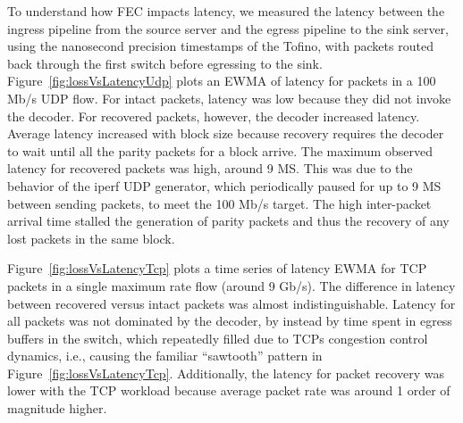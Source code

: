 To understand how FEC impacts latency, we measured the latency  between the
ingress pipeline from the source server and the egress pipeline  to the sink
server, using the nanosecond precision  timestamps of the Tofino, with packets
routed back through the first  switch before egressing to the sink.
Figure~\ref{fig:lossVsLatencyUdp}  plots an EWMA of latency for packets in a
100 Mb/s UDP flow. For  intact packets, latency was low because they did not
invoke  the decoder. For  recovered packets, however, the decoder increased
latency. Average  latency increased with block size because  recovery requires
the decoder to wait until all the parity packets  for a block arrive. The
maximum observed latency for recovered packets  was high, around 9 MS. This
was due to the behavior of the iperf  UDP generator, which periodically paused
for up to 9 MS between  sending packets, to meet the 100 Mb/s target. The high
inter-packet  arrival time stalled the generation of parity packets and thus
the  recovery of any lost packets in the same block.

Figure~\ref{fig:lossVsLatencyTcp} plots a time series of latency EWMA  for TCP
packets in a single maximum rate flow (around 9 Gb/s). The difference in
latency between recovered versus intact packets was almost indistinguishable.
Latency for all packets was not dominated by the decoder, by instead by time
spent  in egress buffers in the switch, which repeatedly filled due to TCPs
congestion  control dynamics, i.e., causing the familiar ``sawtooth'' pattern
in Figure~\ref{fig:lossVsLatencyTcp}. Additionally, the latency for packet
recovery was lower with the TCP workload because average packet rate was
around 1 order of magnitude higher.





